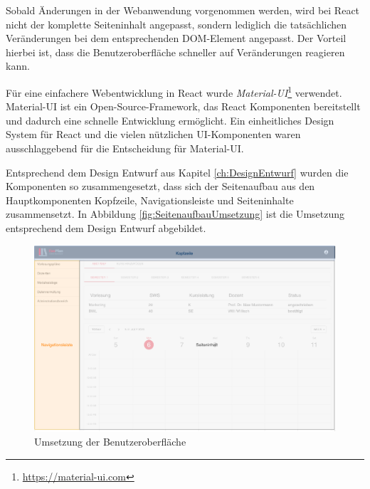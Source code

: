 Sobald Änderungen in der Webanwendung vorgenommen werden, wird bei React nicht der komplette Seiteninhalt angepasst, sondern lediglich die tatsächlichen Veränderungen bei dem entsprechenden \ac{DOM}-Element angepasst. 
Der Vorteil hierbei ist, dass die Benutzeroberfläche schneller auf Veränderungen reagieren kann. 

Für eine einfachere Webentwicklung in React wurde \textit{Material-UI}\footnote{\url{https://material-ui.com}} verwendet. 
Material-UI ist ein Open-Source-Framework, das React Komponenten bereitstellt und dadurch eine schnelle Entwicklung ermöglicht.
Ein einheitliches Design System für React und die vielen nützlichen UI-Komponenten waren ausschlaggebend für die Entscheidung für Material-UI.

Entsprechend dem Design Entwurf aus Kapitel \vref{ch:DesignEntwurf} wurden die Komponenten so zusammengesetzt, dass sich der Seitenaufbau aus den Hauptkomponenten Kopfzeile, Navigationsleiste und Seiteninhalte zusammensetzt. 
In Abbildung \vref{fig:SeitenaufbauUmsetzung} ist die Umsetzung entsprechend dem Design Entwurf abgebildet.

\begin{figure}[h]
	\centering 	\includegraphics[width=\textwidth]{img/FrontEnd/UmsetzungDesign.pdf}
	\captionsetup{format=hang}
	\caption[Umsetzung der Benutzeroberfläche]{\label{fig:SeitenaufbauUmsetzung}Umsetzung der Benutzeroberfläche}
\end{figure}
